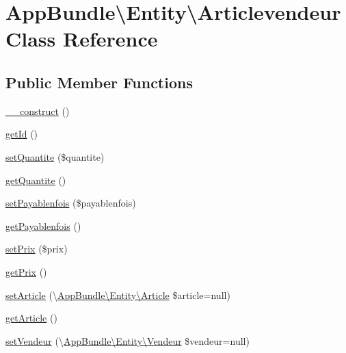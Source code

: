 \hypertarget{class_app_bundle_1_1_entity_1_1_articlevendeur}{}\section{App\+Bundle\textbackslash{}Entity\textbackslash{}Articlevendeur Class Reference}
\label{class_app_bundle_1_1_entity_1_1_articlevendeur}
\subsection*{Public Member Functions}
\begin{DoxyCompactItemize}
\item 
\hyperlink{class_app_bundle_1_1_entity_1_1_articlevendeur_a78b329368f8e3e55f27261662cc57c15}{\+\_\+\+\_\+construct} ()
\item 
\hyperlink{class_app_bundle_1_1_entity_1_1_articlevendeur_aec0178d0e9176f0b005e574d4f3f07a5}{get\+Id} ()
\item 
\hyperlink{class_app_bundle_1_1_entity_1_1_articlevendeur_a89e18aa5866a10cf09494b581956481a}{set\+Quantite} (\$quantite)
\item 
\hyperlink{class_app_bundle_1_1_entity_1_1_articlevendeur_ae1194642b2f8016303d13889259ff507}{get\+Quantite} ()
\item 
\hyperlink{class_app_bundle_1_1_entity_1_1_articlevendeur_a7218d0ec1c75aced2fe278601b0cdbfe}{set\+Payablenfois} (\$payablenfois)
\item 
\hyperlink{class_app_bundle_1_1_entity_1_1_articlevendeur_a138d9243b5c1bac5079eaa3df488498c}{get\+Payablenfois} ()
\item 
\hyperlink{class_app_bundle_1_1_entity_1_1_articlevendeur_a80741e5d2411b3c5018eadbdd58daaa7}{set\+Prix} (\$prix)
\item 
\hyperlink{class_app_bundle_1_1_entity_1_1_articlevendeur_a6ad92eb55bff811cff8d7e468a9d8631}{get\+Prix} ()
\item 
\hyperlink{class_app_bundle_1_1_entity_1_1_articlevendeur_ad74dce1b7f90bc69d37086245ce2214c}{set\+Article} (\textbackslash{}\hyperlink{class_app_bundle_1_1_entity_1_1_article}{App\+Bundle\textbackslash{}\+Entity\textbackslash{}\+Article} \$article=null)
\item 
\hyperlink{class_app_bundle_1_1_entity_1_1_articlevendeur_abd7f6ecdd969255698a8dfc8d978941c}{get\+Article} ()
\item 
\hyperlink{class_app_bundle_1_1_entity_1_1_articlevendeur_a85db136e335effe7933ebc67d1826635}{set\+Vendeur} (\textbackslash{}\hyperlink{class_app_bundle_1_1_entity_1_1_vendeur}{App\+Bundle\textbackslash{}\+Entity\textbackslash{}\+Vendeur} \$vendeur=null)

\end{DoxyCompactItemize}
